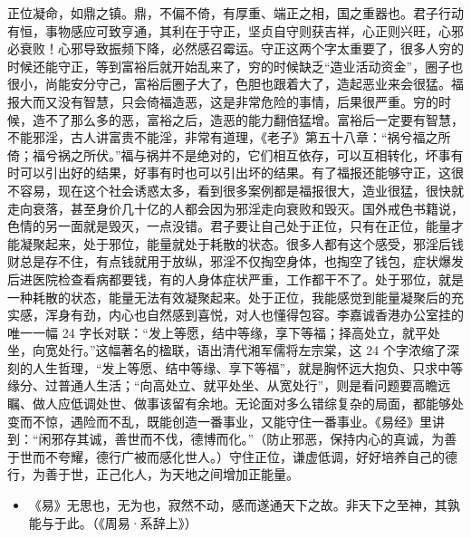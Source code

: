 正位凝命，如鼎之镇。鼎，不偏不倚，有厚重、端正之相，国之重器也。君子行动有恒，事物感应可致亨通，其利在于守正，坚贞自守则获吉祥，心正则兴旺，心邪必衰败！心邪导致振频下降，必然感召霉运。守正这两个字太重要了，很多人穷的时候还能守正，等到富裕后就开始乱来了，穷的时候缺乏“造业活动资金”，圈子也很小，尚能安分守己，富裕后圈子大了，色胆也跟着大了，造起恶业来会很猛。福报大而又没有智慧，只会倚福造恶，这是非常危险的事情，后果很严重。穷的时候，造不了那么多的恶，富裕之后，造恶的能力翻倍猛增。富裕后一定要有智慧，不能邪淫，古人讲富贵不能淫，非常有道理，《老子》第五十八章：“祸兮福之所倚；福兮祸之所伏。”福与祸并不是绝对的，它们相互依存，可以互相转化，坏事有时可以引出好的结果，好事有时也可以引出坏的结果。有了福报还能够守正，这很不容易，现在这个社会诱惑太多，看到很多案例都是福报很大，造业很猛，很快就走向衰落，甚至身价几十亿的人都会因为邪淫走向衰败和毁灭。国外戒色书籍说，色情的另一面就是毁灭，一点没错。君子要让自己处于正位，只有在正位，能量才能凝聚起来，处于邪位，能量就处于耗散的状态。很多人都有这个感受，邪淫后钱财总是存不住，有点钱就用于放纵，邪淫不仅掏空身体，也掏空了钱包，症状爆发后进医院检查看病都要钱，有的人身体症状严重，工作都干不了。处于邪位，就是一种耗散的状态，能量无法有效凝聚起来。处于正位，我能感觉到能量凝聚后的充实感，浑身有劲，内心也自然感到喜悦，对人也懂得包容。李嘉诚香港办公室挂的唯一一幅 24 字长对联：“发上等愿，结中等缘，享下等福；择高处立，就平处坐，向宽处行。”这幅著名的楹联，语出清代湘军儒将左宗棠，这 24 个字浓缩了深刻的人生哲理，“发上等愿、结中等缘、享下等福”，就是胸怀远大抱负、只求中等缘分、过普通人生活；“向高处立、就平处坐、从宽处行”，则是看问题要高瞻远瞩、做人应低调处世、做事该留有余地。无论面对多么错综复杂的局面，都能够处变而不惊，遇险而不乱，既能创造一番事业，又能守住一番事业。《易经》里讲到：“闲邪存其诚，善世而不伐，德博而化。”（防止邪恶，保持内心的真诚，为善于世而不夸耀，德行广被而感化世人。）守住正位，谦虚低调，好好培养自己的德行，为善于世，正己化人，为天地之间增加正能量。

\begin{itemize}\it
    \item 《易》无思也，无为也，寂然不动，感而遂通天下之故。非天下之至神，其孰能与于此。（《周易·系辞上》）
\end{itemize}


